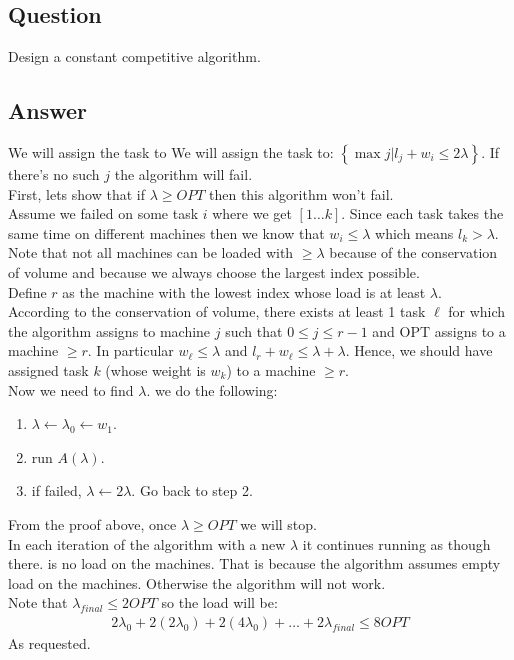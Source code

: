 \subsection{Question}
Design a constant competitive algorithm.

\subsection{Answer}
We will assign the task to We will assign the task to: $\left\{\max j|l_{j} + w_i \leq  2\lambda\right\}$. If there's no such $j$ the algorithm will fail.\\
First, lets show that if $\lambda\geq OPT$ then this algorithm won't fail.\\
Assume we failed on some task $i$ where we get $[1\dots k]$. Since each task takes the same time on different machines then we know that $ w_{i} \leq \lambda $ which means $l_{k}>\lambda$. Note that not all machines can be loaded with $\geq \lambda$  because of the conservation of volume and because we always choose the largest index possible.\\
Define $r$ as the machine with the lowest index whose load is at least $\lambda$.\\
According to the conservation of volume, there exists at least 1 task $\ell$ for which the algorithm assigns to machine $j$ such that $0 \leq j \leq r-1$ and OPT assigns to a machine $\geq r$. In particular $w_{\ell} \leq \lambda$ and $l_r + w_\ell \leq \lambda + \lambda$. Hence, we should have assigned task $k$ (whose weight is $w_k$) to a machine $\geq r$.\\
Now we need to find $\lambda$. we do the following:
\begin{enumerate}
    \item $\lambda \leftarrow \lambda_{0} \leftarrow w_{1}$.
    \item run $A(\lambda)$.
    \item if failed, $\lambda \leftarrow 2\lambda$. Go back to step 2.
\end{enumerate}

From the proof above, once $\lambda \geq OPT$ we will stop.\\
In each iteration of the algorithm with a new $\lambda$ it continues running as though there. is no load on the machines. That is because the algorithm assumes empty load on the machines. Otherwise the algorithm will not work.\\
Note that $\lambda_{final} \leq 2OPT$ so the load will be: 
\begin{gather*}
2\lambda_0 + 2(2\lambda_0) + 2(4\lambda_0) + \dots + 2\lambda_{final} \leq 8OPT
\end{gather*}
As requested.